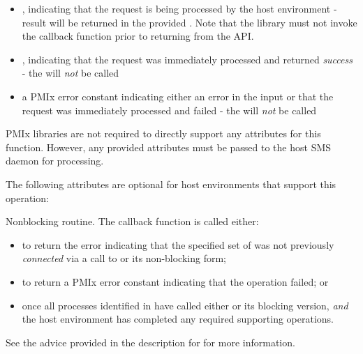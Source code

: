 \begin{itemize}
    \item {}, indicating that the request is being processed by the host environment - result will be returned in the provided . Note that the library must not invoke the callback function prior to returning from the \ac{API}.
    \item {}, indicating that the request was immediately processed and returned \textit{success} - the  will \textit{not} be called
    \item a PMIx error constant indicating either an error in the input or that the request was immediately processed and failed - the  will \textit{not} be called
\end{itemize}

\reqattrstart
\ac{PMIx} libraries are not required to directly support any attributes for this function. However, any provided attributes must be passed to the host \ac{SMS} daemon for processing.

\reqattrend

\optattrstart
The following attributes are optional for host environments that support this operation:


\optattrend

\descr

Nonblocking  routine. The callback function is called either:

\begin{itemize}
    \item to return the  error indicating that the specified set of  was not previously \textit{connected} via a call to  or its non-blocking form;

    \item to return a \ac{PMIx} error constant indicating that the operation failed; or

    \item once all processes identified in  have called either  or its blocking version, \textit{and} the host environment has completed any required supporting operations.
\end{itemize}

See the advice provided in the description for  for more information.

